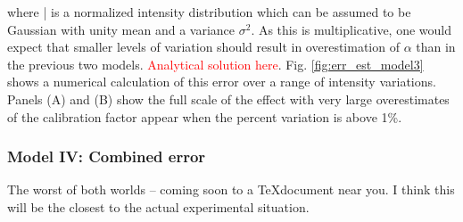 where \bar{\Theta} is a normalized intensity distribution which can be assumed to be Gaussian with
unity mean and a variance $\sigma^2$. As this is multiplicative, one would expect that smaller
levels of variation should result in overestimation of $\alpha$ than in the previous two models.
\textcolor{red}{Analytical solution here}. Fig. \ref{fig:err_est_model3} shows a numerical calculation
of this error over a range of intensity variations. Panels (A) and (B) show the full scale of the
effect with very large overestimates of the calibration factor appear when the percent variation is
above 1\%.

\begin{figure}
\end{figure}

\subsubsection*{Model IV: Combined error}
The worst of both worlds -- coming soon to a \TeX document near you. I think this will be the
closest to the actual experimental situation.
